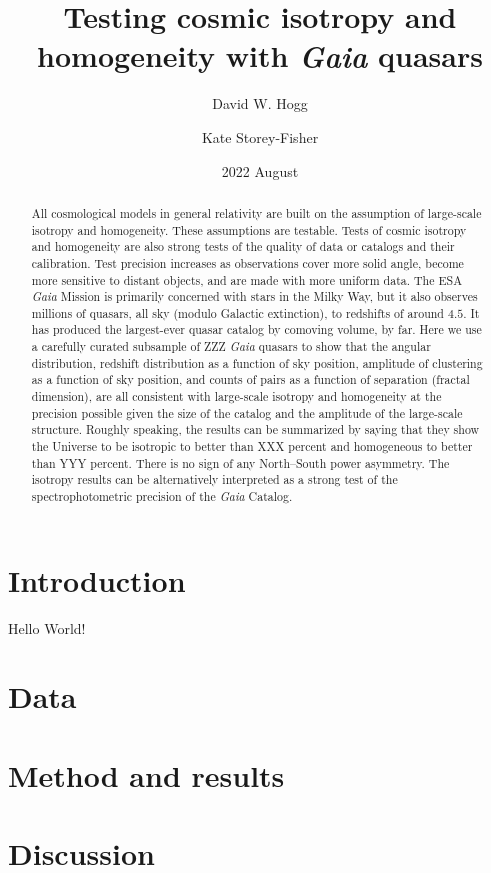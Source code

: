 \documentclass[modern]{aastex631}
\begin{document}
\title{%
Testing cosmic isotropy and homogeneity
with \textsl{Gaia} quasars}
\author{David W. Hogg}

\author{Kate Storey-Fisher}

\date{2022 August}

\begin{abstract}\noindent
All cosmological models in general relativity are built on the assumption of large-scale isotropy and homogeneity.
These assumptions are testable.
Tests of cosmic isotropy and homogeneity are also strong tests of the quality of data or catalogs and their calibration.
Test precision increases as observations cover more solid angle, become more sensitive to distant objects, and are made with more uniform data.
The ESA \textsl{Gaia} Mission is primarily concerned with stars in the Milky Way, but it also observes millions of quasars, all sky (modulo Galactic extinction), to redshifts of around $4.5$.
It has produced the largest-ever quasar catalog by comoving volume, by far.
Here we use a carefully curated subsample of ZZZ \textsl{Gaia} quasars to show that the angular distribution, redshift distribution as a function of sky position, amplitude of clustering as a function of sky position, and counts of pairs as a function of separation (fractal dimension), are all consistent with large-scale isotropy and homogeneity at the precision possible given the size of the catalog and the amplitude of the large-scale structure.
Roughly speaking, the results can be summarized by saying that they show the Universe to be isotropic to better than XXX percent and homogeneous to better than YYY percent.
There is no sign of any North--South power asymmetry.
The isotropy results can be alternatively interpreted as a strong test of the spectrophotometric precision of the \textsl{Gaia} Catalog.
\end{abstract}


\section{Introduction}

Hello World!

\section{Data}

\section{Method and results}

\section{Discussion}
\end{document}
